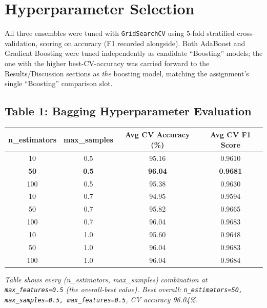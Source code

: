 \documentclass[12pt,a4paper]{article}
\begin{document}
\section{Hyperparameter Selection}
All three ensembles were tuned with \texttt{GridSearchCV} using 5-fold stratified
cross-validation, scoring on accuracy (F1 recorded alongside). Both AdaBoost and Gradient
Boosting were tuned independently as candidate ``Boosting'' models; the one with the higher
best-CV-accuracy was carried forward to the Results/Discussion sections as \emph{the} boosting
model, matching the assignment's single ``Boosting'' comparison slot.

\subsection*{Table 1: Bagging Hyperparameter Evaluation}
\begin{tabular}{ccc c}
\toprule
n\_estimators & max\_samples & Avg CV Accuracy (\%) & Avg CV F1 Score \\
\midrule
10  & 0.5 & 95.16 & 0.9610 \\
\textbf{50}  & \textbf{0.5} & \textbf{96.04} & \textbf{0.9681} \\
100 & 0.5 & 95.38 & 0.9630 \\
10  & 0.7 & 94.95 & 0.9594 \\
50  & 0.7 & 95.82 & 0.9665 \\
100 & 0.7 & 96.04 & 0.9683 \\
10  & 1.0 & 95.60 & 0.9648 \\
50  & 1.0 & 96.04 & 0.9683 \\
100 & 1.0 & 96.04 & 0.9684 \\
\bottomrule
\end{tabular}
\vspace{2mm}

\textit{Table shows every (n\_estimators, max\_samples) combination at
\texttt{max\_features=0.5} (the overall-best value). Best overall:
\texttt{n\_estimators=50, max\_samples=0.5, max\_features=0.5}, CV accuracy 96.04\%.}
\end{document}
